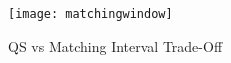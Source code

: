 \begin{figure}
    \texttt{[image: matchingwindow]}
    \label{fig:matchinginterval}
    \caption{QS vs Matching Interval Trade-Off}
\end{figure}










